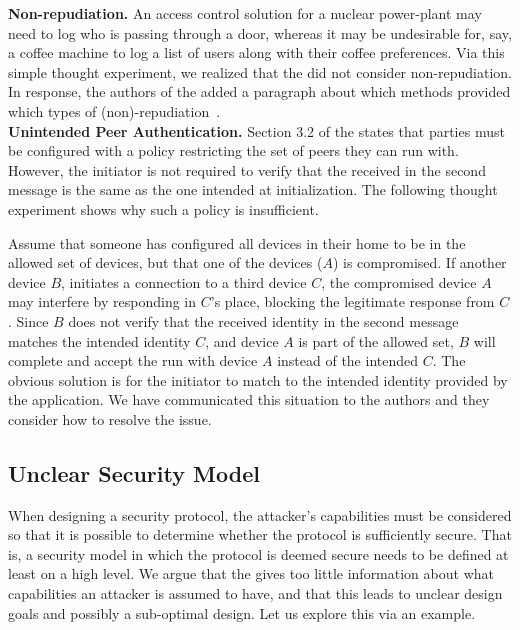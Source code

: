 \documentclass[runningheads, envcountsame, a4paper, draft, x11names]{llncs}
\newcommand{\runhead}[1]{\noindent\textbf{#1. }}
\begin{document}
\runhead{Non-repudiation}
An access control solution for a nuclear power-plant may need to log who is
passing through a door, whereas it may be undesirable for, say, a coffee
machine to log a list of users along with their coffee preferences.
%
Via this simple thought experiment, we realized that the \mSpec{} did not
consider non-repudiation.
%
In response, the authors of the \mSpec{} added a paragraph about which methods
provided which types of (non)-repudiation~\cite{personalCommunication}. \\

\runhead{Unintended Peer Authentication}
Section 3.2 of the \mSpec{} states that parties must be configured
with a policy restricting the set of peers they can run \mEdhoc{} with.
%
However, the initiator is not required to verify that the \mIdcredr{} received
in the second message is the same as the one intended at initialization.
%
The following thought experiment shows why such a policy is insufficient.
%

Assume that someone has configured all devices in their home to be in the
allowed set of devices, but that one of the devices ($A$) is compromised.
%
If another device $B$, initiates a connection to a third device $C$, the
compromised device $A$ may interfere by responding in $C$'s place, blocking
the legitimate response from $C$.
%
Since $B$ does not verify that the received identity in the second message
matches the intended identity $C$, and device $A$ is part of the allowed set,
$B$ will complete and accept the \mEdhoc{} run with device $A$ instead of the
intended $C$.
%
The obvious solution is for the initiator to match \mIdcredr{} to the intended
identity provided by the application.
%
We have communicated this situation to the \mEdhoc{} authors and they consider
how to resolve the issue.
%

\subsection{Unclear Security Model}
When designing a security protocol, the attacker's capabilities must be
considered so that it is possible to determine whether the protocol is
sufficiently secure.
%
That is, a security model in which the protocol is deemed
secure needs to be defined at least on a high level.
%
We argue that the \mSpec{} gives too little information about what capabilities
an attacker is assumed to have, and that this leads to unclear design goals and
possibly a sub-optimal design.
%
Let us explore this via an example.
%
\end{document}
